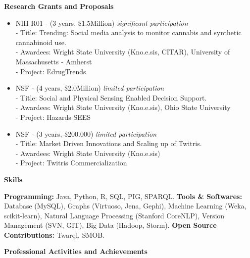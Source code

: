 \documentclass[letterpaper,9pt]{article}
\newcommand{\resheading}[1]{{\large \colorbox{mygrey}{\begin{minipage}{\textwidth}{\textbf{#1 \vphantom{p\^{E}}}}\end{minipage}}}}
\begin{document}
\resheading{Research Grants and Proposals}
\begin{itemize}
\item NIH-R01 - (3 years, \$1.5Million) \textit{significant participation}\\
- Title: Trending: Social media analysis to monitor cannabis and synthetic cannabinoid use.\\
- Awardees: Wright State University (Kno.e.sis, CITAR), University of Massachusetts - Amherst \\
- Project: EdrugTrends
\item NSF - (4 years, \$2.0Million) \textit{limited participation}\\
- Title: Social and Physical Sensing Enabled Decision Support.\\
- Awardees: Wright State University (Kno.e.sis), Ohio State University \\
- Project: Hazards SEES
\item NSF - (3 years, \$200.000) \textit{limited participation}\\
- Title: Market Driven Innovations and Scaling up of Twitris.\\
- Awardees: Wright State University (Kno.e.sis) \\
- Project: Twitris Commercialization
\end{itemize}

\resheading{Skills}
\vspace{0.05in}

\textbf{Programming:} Java, Python, R, SQL, PIG, SPARQL.\linebreak
\textbf{Tools \& Softwares:} Database (MySQL), Graphs (Virtuoso, Jena, Gephi), Machine Learning (Weka, scikit-learn), Natural Language Processing (Stanford CoreNLP), Version Management (SVN, GIT), Big Data (Hadoop, Storm).\linebreak
\textbf{Open Source Contributions:} Twarql, SMOB.\linebreak 

\resheading{Professional Activities and Achievements}
\vspace{0.0in}
\end{document}
